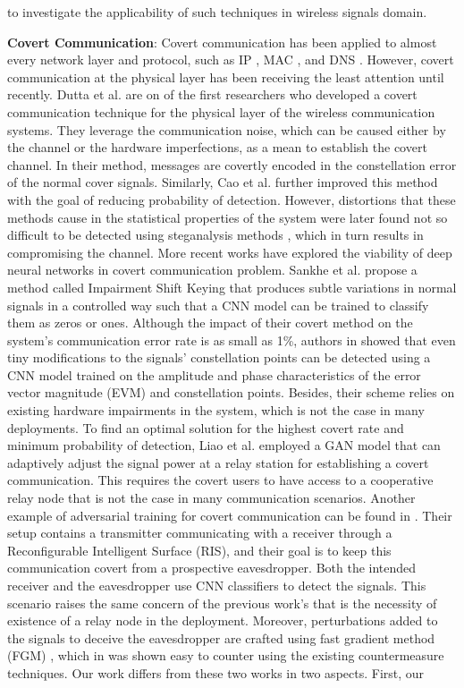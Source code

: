 to investigate the applicability of such techniques in wireless signals domain.


\textbf{Covert Communication}: Covert communication has been applied to almost every network layer and protocol, such as IP \cite{cabuk2004ip}, MAC \cite{sheikholeslami2020covert}, and DNS \cite{nussbaum2009robust}. However, covert communication at the physical layer has been receiving the least attention until recently. Dutta et al. \cite{dutta2012secret} are on of the first researchers who developed a covert communication technique for the physical layer of the wireless communication systems. They leverage the communication noise, which can be caused either by the channel or the hardware imperfections, as a mean to establish the covert channel. In their method, messages are covertly encoded in the constellation error of the normal cover signals. Similarly, Cao et al. \cite{cao2018wireless} further improved this method with the goal of reducing probability of detection. However, distortions that these methods cause in the statistical properties of the system were later found not so difficult to be detected using steganalysis methods \cite{huang2020exploiting}, which in turn results in compromising the channel. More recent works have explored the viability of deep neural networks in covert communication problem. Sankhe et al. \cite{sankhe2019impairment} propose a method called Impairment Shift Keying that produces subtle variations in normal signals in a controlled way such that a CNN model can be trained to classify them as zeros or ones. Although the impact of their covert method on the system's communication error rate is as small as 1\%,  authors in \cite{huang2021detection} showed that even tiny modifications to the signals' constellation points can be detected using a CNN model trained on the amplitude and phase characteristics of the error vector magnitude (EVM) and constellation points. Besides, their scheme relies on existing hardware impairments in the system, which is not the case in many deployments. To find an optimal solution for the highest covert rate and minimum probability of detection, Liao et al. \cite{liao2020generative} employed a GAN model that can adaptively adjust the signal power at a relay station for establishing a covert communication. This requires the covert users to have access to a cooperative relay node that is not the case in many communication scenarios. Another example of adversarial training for covert communication can be found in \cite{kim2022covert}. Their setup contains a transmitter communicating with a receiver through a Reconfigurable Intelligent Surface (RIS), and their goal is to keep this communication covert from a prospective eavesdropper. Both the intended receiver and the eavesdropper use CNN classifiers to detect the signals. This scenario raises the same concern of the previous work's that is the necessity of existence of a relay node in the deployment. Moreover, perturbations added to the signals to deceive the eavesdropper are crafted using fast gradient method (FGM) \cite{goodfellow2014explaining}, which in \cite{bahramali2021robust} was shown easy to counter using the existing countermeasure techniques. Our work differs from these two works in two aspects. First, our 